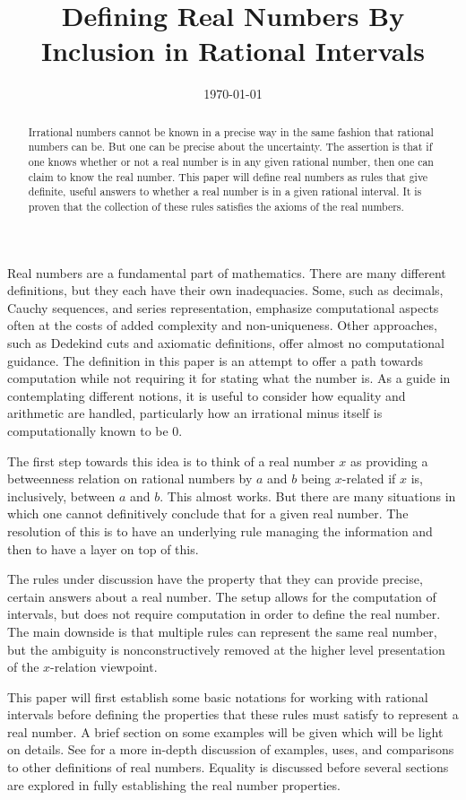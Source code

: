 \documentclass[12pt]{article}
\title{Defining Real Numbers By Inclusion in Rational Intervals}
\date{\today}
\begin{document}
\maketitle
\begin{abstract}
Irrational numbers cannot be known in a precise way in the same fashion that rational numbers can be. But one can be precise about the uncertainty. The assertion is that if one knows whether or not a real number is in any given rational number, then one can claim to know the real number. This paper will define real numbers as rules that give definite, useful answers to whether a real number is in a given rational interval. It is proven that the collection of these rules satisfies the axioms of the real numbers. 
\end{abstract}

Real numbers are a fundamental part of mathematics. There are many different definitions, but they each have their own inadequacies. Some, such as decimals, Cauchy sequences, and series representation, emphasize computational aspects often at the costs of added complexity and non-uniqueness. Other approaches, such as Dedekind cuts and axiomatic definitions, offer almost no computational guidance. The definition in this paper is an attempt to offer a path towards computation while not requiring it for stating what the number is. As a guide in contemplating different notions, it is useful to consider how equality and arithmetic are handled, particularly how an irrational minus itself is computationally known to be 0. 

The first step towards this idea is to think of a real number $x$ as providing a betweenness relation on rational numbers by $a$ and $b$ being $x$-related if $x$ is, inclusively, between $a$ and $b$. This almost works. But there are many situations in which one cannot definitively conclude that for a given real number. The resolution of this is to have an underlying rule managing the information and then to have a layer on top of this. 

The rules under discussion have the property that they can provide precise, certain answers about a real number. The setup allows for the computation of intervals, but does not require computation in order to define the real number. The main downside is that multiple rules can represent the same real number, but the ambiguity is nonconstructively removed at the higher level presentation of the $x$-relation viewpoint.  

This paper will first establish some basic notations for working with rational intervals before defining the properties that these rules must satisfy to represent a real number. A brief section on some examples will be given which will be light on details. See \cite{taylor23main} for a more in-depth discussion of examples, uses, and comparisons to other definitions of real numbers. Equality is discussed before several sections are explored in fully establishing the real number properties. 
\end{document}
